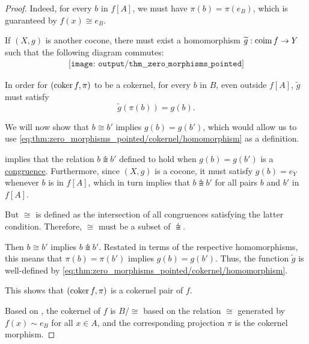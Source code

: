 \begin{proof}
  Indeed, for every \( b \) in \( f[A] \), we must have \( \pi(b) = \pi(e_B) \), which is guaranteed by \( f(x) \cong e_B \).

   If \( (X, g) \) is another cocone, there must exist a homomorphism \( \widetilde g: \operatorname*{co\negthinspace\operatorname{im}} f \to Y \) such that the following diagram commutes:
  \begin{equation*}
    \begin{aligned}
      \texttt{[image: output/thm\_\_zero\_morphisms\_pointed]}
    \end{aligned}
  \end{equation*}

  In order for \( (\operatorname*{co\negthinspace\ker} f, \pi) \) to be a cokernel, for every \( b \) in \( B \), even outside \( f[A] \), \( \widetilde g \) must satisfy
  \begin{equation}\label{eq:thm:zero_morphisms_pointed/cokernel/homomorphism}
    \widetilde{g}(\pi(b)) = g(b).
  \end{equation}

  We will now show that \( b \cong b' \) implies \( g(b) = g(b') \), which would allow us to use \eqref{eq:thm:zero_morphisms_pointed/cokernel/homomorphism} as a definition.

   implies that the relation \( b \congdot b' \) defined to hold when \( g(b) = g(b') \) is a \hyperref[def:first_order_congruence]{congruence}. Furthermore, since \( (X, g) \) is a cocone, it must satisfy \( g(b) = e_Y \) whenever \( b \) is in \( f[A] \), which in turn implies that \( b \congdot b' \) for all pairs \( b \) and \( b' \) in \( f[A] \).

  But \( {\cong} \) is defined as the intersection of all congruences satisfying the latter condition. Therefore, \( {\cong} \) must be a subset of \( {\congdot} \).

  Then \( b \cong b' \) implies \( b \congdot b' \). Restated in terms of the respective homomorphisms, this means that \( \pi(b) = \pi(b') \) implies \( g(b) = g(b') \). Thus, the function \( \widetilde{g} \) is well-defined by \eqref{eq:thm:zero_morphisms_pointed/cokernel/homomorphism}.

  This shows that \( (\operatorname*{co\negthinspace\ker} f, \pi) \) is a cokernel pair of \( f \).

   Based on , the cokernel of \( f \) is \( B / {\cong} \) based on the relation \( {\cong} \) generated by \( f(x) \sim e_B \) for all \( x \in A \), and the corresponding projection \( \pi \) is the cokernel morphism.


\end{proof}
